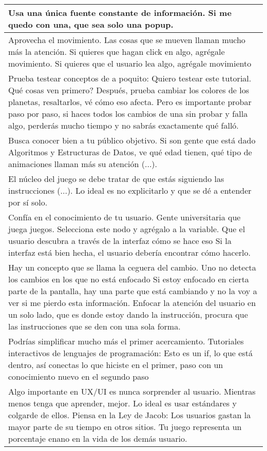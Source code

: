 \begin{table}[h]
\begin{tabular}{|p{\linewidth}|}
   Usa una única fuente constante de información. Si me quedo con una, que sea solo una popup. \\\hline

   Aprovecha el movimiento. Las cosas que se mueven llaman mucho más la atención. Si quieres que hagan click en algo, agrégale movimiento. Si quieres que el usuario lea algo, agrégale movimiento \\\hline

   Prueba testear conceptos de a poquito: Quiero testear este tutorial. Qué cosas ven primero? Después, prueba cambiar los colores de los planetas, resaltarlos, vé cómo eso afecta. Pero es importante probar paso por paso, si haces todos los cambios de una sin probar y falla algo, perderás mucho tiempo y no sabrás exactamente qué falló. \\\hline

   Busca conocer bien a tu público objetivo. Si son gente que está dado Algoritmos y Estructuras de Datos, ve qué edad tienen, qué tipo de animaciones llaman más su atención (...). \\\hline

   El núcleo del juego se debe tratar de que estás siguiendo las instrucciones (...). Lo ideal es no explicitarlo y que se dé a entender por sí solo. \\\hline

   
   Confía en el conocimiento de tu usuario. Gente universitaria que juega
   juegos. Selecciona este nodo y agrégalo a la variable. Que el usuario
   descubra a través de la interfaz cómo se hace eso
   Si la interfaz está bien hecha, el usuario debería encontrar cómo hacerlo. \\\hline

   Hay un concepto que se llama la ceguera del cambio.
   Uno no detecta los cambios en los que no está enfocado
   Si estoy enfocado en cierta parte de la pantalla, hay una parte que está cambiando y no la voy a ver si me pierdo esta información.
   Enfocar la atención del usuario en un solo lado, que es donde estoy dando la instrucción, procura que las instrucciones que se den con una sola forma. \\\hline

   Podrías simplificar mucho más el primer acercamiento. Tutoriales interactivos de lenguajes de programación: Esto es un if, lo que está dentro, así conectas lo que hiciste en el primer, paso con un conocimiento nuevo en el segundo paso \\\hline

   Algo importante en UX/UI es nunca sorprender al usuario. Mientras menos tenga que aprender, mejor. Lo ideal es usar estándares y colgarde de ellos. Piensa en la Ley de Jacob: Los usuarios gastan la mayor parte de su tiempo en otros sitios. Tu juego representa un porcentaje enano en la vida de los demás usuario.  \\

   \hline
   \end{tabular}
\end{table}

\restoregeometry
